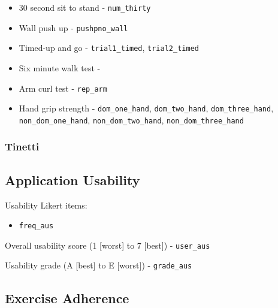 \documentclass[
]{article}
\providecommand{\tightlist}{%
  \setlength{\itemsep}{0pt}\setlength{\parskip}{0pt}}
\begin{document}
\begin{itemize}\tightlist
  \item 30 second sit to stand - \texttt{num\_thirty}
  \item Wall push up - \texttt{pushpno\_wall}
  \item Timed-up and go - \texttt{trial1\_timed}, \texttt{trial2\_timed}
  \item Six minute walk test - 
  \item Arm curl test - \texttt{rep\_arm}
  \item Hand grip strength - \texttt{dom\_one\_hand}, \texttt{dom\_two\_hand}, \texttt{dom\_three\_hand}, 
    \texttt{non\_dom\_one\_hand}, \texttt{non\_dom\_two\_hand}, \texttt{non\_dom\_three\_hand}
\end{itemize}

\subsubsection{Tinetti}


\subsection{Application Usability}

Usability Likert items:
\begin{itemize}\tightlist
  \item \texttt{freq\_aus}
\end{itemize}

Overall usability score (1 [worst] to 7 [best]) - \texttt{user\_aus}

Usability grade (A [best] to E [worst]) - \texttt{grade\_aus}


\subsection{Exercise Adherence}
\end{document}
